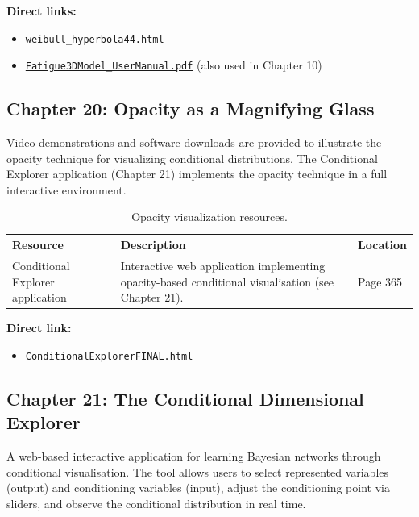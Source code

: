 \noindent
\textbf{Direct links:}
\begin{itemize}
    \item \href{https://enriquecastilloron.github.io/mi-libro-interactivo/apps/weibull_hyperbola44.html}{\nolinkurl{weibull_hyperbola44.html}}
    \item \href{https://github.com/enriquecastilloron-coder/PRUEBA/raw/main/Fatigue3DModel_UserManual.pdf}{\nolinkurl{Fatigue3DModel_UserManual.pdf}} (also used in Chapter 10)
\end{itemize}

\subsection{Chapter 20: Opacity as a Magnifying Glass}

Video demonstrations and software downloads are provided to illustrate the opacity technique for visualizing conditional distributions. The Conditional Explorer application (Chapter 21) implements the opacity technique in a full interactive environment.

\begin{table}[H]
\centering
\caption{Opacity visualization resources.}
\begin{tabular}{p{3.5cm}p{8cm}p{2.5cm}}
\toprule
\textbf{Resource} & \textbf{Description} & \textbf{Location} \\
\midrule
Conditional Explorer application & Interactive web application implementing opacity-based conditional visualisation (see Chapter 21). & Page 365 \\
\bottomrule
\end{tabular}
\end{table}

\noindent
\textbf{Direct link:}
\begin{itemize}
    \item \href{https://enriquecastilloron.github.io/mi-libro-interactivo/apps/ConditionalExplorerFINAL.html}{\nolinkurl{ConditionalExplorerFINAL.html}}
\end{itemize}

\subsection{Chapter 21: The Conditional Dimensional Explorer}

A web-based interactive application for learning Bayesian networks through conditional visualisation. The tool allows users to select represented variables (output) and conditioning variables (input), adjust the conditioning point via sliders, and observe the conditional distribution in real time.

